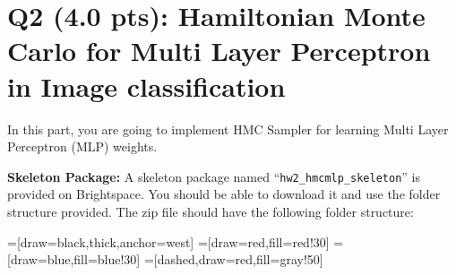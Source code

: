 
\section{Q2 (4.0 pts): Hamiltonian Monte Carlo for Multi Layer Perceptron in Image classification} In this part, you are going to implement HMC Sampler for learning Multi Layer Perceptron (MLP) weights.
%

%
\hfill

%
\noindent \textbf{Skeleton Package:}
%
A skeleton package named ``\texttt{hw2\_hmcmlp\_skeleton}'' is provided on Brightspace.
%
You should be able to download it and use the folder structure provided.
%
%
\noindent The zip file should have the following folder structure:

%
=[draw=black,thick,anchor=west]
=[draw=red,fill=red!30]
=[draw=blue,fill=blue!30]
=[dashed,draw=red,fill=gray!50]
%

%
\hfill

